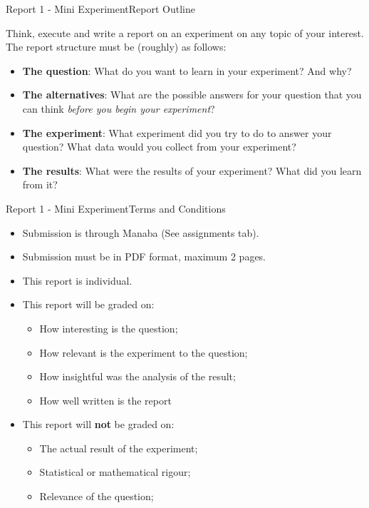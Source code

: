 \documentclass[t]{beamer}
\begin{document}
\begin{ftst}
  {Report 1 - Mini Experiment}{Report Outline}

  Think, execute and write a report on an experiment on any topic of
  your interest. The report structure must be (roughly) as follows:

  \vone

  \begin{itemize}
  \item {\bf The question}: What do you want to learn in your experiment? And why?
  \item {\bf The alternatives}: What are the possible answers for your
    question that you can think \emph{before you begin your
      experiment}?
  \item {\bf The experiment}: What experiment did you try to do to
    answer your question? What data would you collect from your experiment?
  \item {\bf The results}: What were the results of your experiment?
    What did you learn from it?
  \end{itemize}
\end{ftst}

\begin{ftst}
  {Report 1 - Mini Experiment}{Terms and Conditions}

  \begin{itemize}
  \item Submission is through Manaba (See assignments tab).
  \item Submission must be in PDF format, maximum 2 pages.
  \item This report is individual.
  \item This report will be graded on:
    \begin{itemize}
    \item How interesting is the question;
    \item How relevant is the experiment to the question;
    \item How insightful was the analysis of the result;
    \item How well written is the report
    \end{itemize}
  \item This report will {\bf not} be graded on:
    \begin{itemize}
    \item The actual result of the experiment;
    \item Statistical or mathematical rigour;
    \item Relevance of the question;
    \end{itemize}
  \end{itemize}
\end{ftst}
\end{document}
